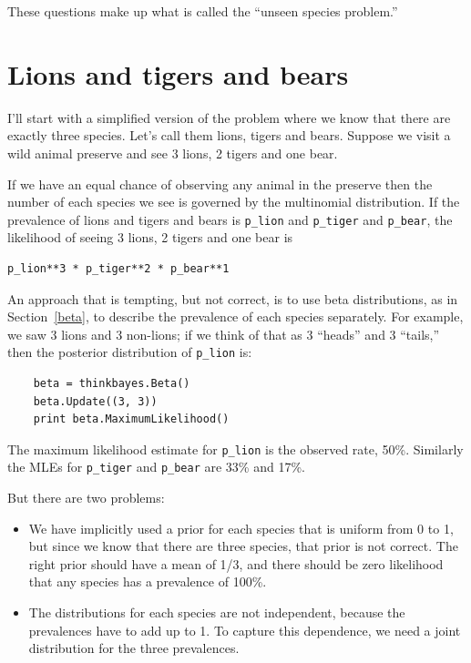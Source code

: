 \documentclass[12pt]{book}
\begin{document}
These questions make up what is called the ``unseen species problem.''


\section{Lions and tigers and bears}

I'll start with a simplified version of the problem where we know that
there are exactly three species.  Let's call them lions, tigers and
bears.  Suppose we visit a wild animal preserve and see 3 lions, 2
tigers and one bear.

If we have an equal chance of observing any animal in the preserve
then the number of each species we see is governed by the multinomial
distribution.  If the prevalence of lions and tigers and bears is
\verb"p_lion" and \verb"p_tiger" and \verb"p_bear", the likelihood of
seeing 3 lions, 2 tigers and one bear is

\begin{verbatim}
p_lion**3 * p_tiger**2 * p_bear**1
\end{verbatim}

An approach that is tempting, but not correct, is to use beta
distributions, as in Section~\ref{beta}, to describe the prevalence of
each species separately.  For example, we saw 3 lions and 3 non-lions;
if we think of that as 3 ``heads'' and 3 ``tails,'' then the posterior
distribution of \verb"p_lion" is:

\begin{verbatim}
    beta = thinkbayes.Beta()
    beta.Update((3, 3))
    print beta.MaximumLikelihood()
\end{verbatim}

The maximum likelihood estimate for \verb"p_lion" is the observed
rate, 50\%.  Similarly the MLEs for \verb"p_tiger" and \verb"p_bear"
are 33\% and 17\%.

But there are two problems:

\begin{itemize}

\item We have implicitly used a prior for each species that is uniform
  from 0 to 1, but since we know that there are three species, that
  prior is not correct.  The right prior should have a mean of 1/3,
  and there should be zero likelihood that any species has a
  prevalence of 100\%.

\item The distributions for each species are not independent, because
  the prevalences have to add up to 1.  To capture this dependence, we
  need a joint distribution for the three prevalences.

\end{itemize}
\end{document}
